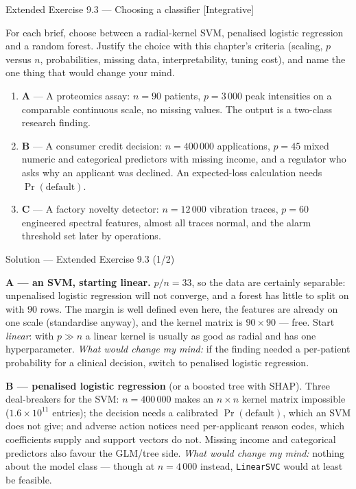 \documentclass[aspectratio=169,11pt]{beamer}
\begin{document}
\begin{frame}{Extended Exercise 9.3 --- Choosing a classifier [Integrative]}
\begin{longexercise}
  For each brief, choose between a radial-kernel SVM, penalised logistic
  regression and a random forest. Justify the choice with this chapter's
  criteria (scaling, $p$ versus $n$, probabilities, missing data,
  interpretability, tuning cost), and name the one thing that would change your
  mind.
  \begin{enumerate}
    \item \textbf{A} --- A proteomics assay: $n=90$ patients, $p=3\,000$ peak
          intensities on a comparable continuous scale, no missing values. The
          output is a two-class research finding.
    \item \textbf{B} --- A consumer credit decision: $n=400\,000$
          applications, $p=45$ mixed numeric and categorical predictors with
          missing income, and a regulator who asks why an applicant was
          declined. An expected-loss calculation needs $\Pr(\text{default})$.
    \item \textbf{C} --- A factory novelty detector: $n=12\,000$ vibration
          traces, $p=60$ engineered spectral features, almost all traces
          normal, and the alarm threshold set later by operations.
  \end{enumerate}
\end{longexercise}
\end{frame}

\begin{frame}{Solution --- Extended Exercise 9.3 (1/2)}
\begin{solutionbox}
  \scriptsize
  \textbf{A --- an SVM, starting linear.} $p/n = 33$, so the data are certainly
  separable: unpenalised logistic regression will not converge, and a forest
  has little to split on with $90$ rows. The margin is well defined even here,
  the features are already on one scale (standardise anyway), and the kernel
  matrix is $90\times90$ --- free. Start \emph{linear}: with $p\gg n$ a linear
  kernel is usually as good as radial and has one hyperparameter.
  \emph{What would change my mind:} if the finding needed a per-patient
  probability for a clinical decision, switch to penalised logistic regression.

  \textbf{B --- penalised logistic regression} (or a boosted tree with SHAP).
  Three deal-breakers for the SVM: $n=400\,000$ makes an $n\times n$ kernel
  matrix impossible ($1.6\times10^{11}$ entries); the decision needs a
  calibrated $\Pr(\text{default})$, which an SVM does not give; and adverse
  action notices need per-applicant reason codes, which coefficients supply and
  support vectors do not. Missing income and categorical predictors also favour
  the GLM/tree side. \emph{What would change my mind:} nothing about the model
  class --- though at $n=4\,000$ instead, \texttt{LinearSVC} would at least be
  feasible.
\end{solutionbox}
\end{frame}
\end{document}
